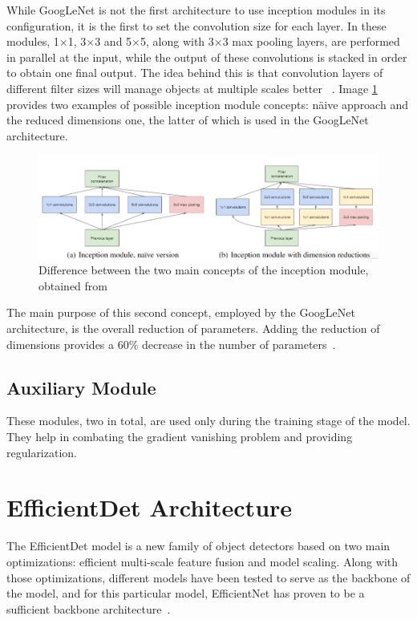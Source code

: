 While GoogLeNet is not the first architecture to use inception modules in its configuration, it is the first to set the convolution size for each layer. In these modules, 1$\times$1, 3$\times$3 and 5$\times$5, along with 3$\times$3 max pooling layers, are performed in parallel at the input, while the output of these convolutions is stacked in order to obtain one final output. The idea behind this is that convolution layers of different filter sizes will manage objects at multiple scales better ~\cite{link17}. Image \ref{fig:fig43} provides two examples of possible inception module concepts: n\"aive approach and the reduced dimensions one, the latter of which is used in the GoogLeNet architecture.

\begin{figure}[H]
    \centering
    \includegraphics[width=1\linewidth]{figures/Figure57.png}
    \caption{Difference between the two main concepts of the inception module, obtained from ~\cite{carte13}}
    \label{fig:fig43}
\end{figure}

The main purpose of this second concept, employed by the GoogLeNet architecture, is the overall reduction of parameters. Adding the reduction of dimensions provides a 60\% decrease in the number of parameters~\cite{carte14}.

\subsection{Auxiliary Module}

These modules, two in total, are used only during the training stage of the model. They help in combating the gradient vanishing problem and providing regularization.

\section{EfficientDet Architecture}

The EfficientDet model is a new family of object detectors based on two main optimizations: efficient multi-scale feature fusion and model scaling. Along with those optimizations, different models have been tested to serve as the backbone of the model, and for this particular model, EfficientNet has proven to be a sufficient backbone architecture~\cite{carte8}.

